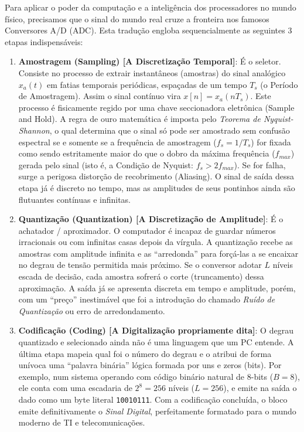 Para aplicar o poder da computação e a inteligência dos processadores no mundo físico, precisamos que o sinal do mundo real cruze a fronteira nos famosos Conversores A/D (ADC). Esta tradução engloba sequencialmente as seguintes 3 etapas indispensáveis:

\begin{enumerate}
\def\labelenumi{\arabic{enumi}.}
\tightlist
\item
  \textbf{Amostragem (Sampling) {[}A Discretização Temporal{]}}: É o seletor. Consiste no processo de extrair instantâneos (amostras) do sinal analógico \(x_a(t)\) em fatias temporais periódicas, espaçadas de um tempo \(T_s\) (o Período de Amostragem). Assim o sinal contínuo vira \(x[n] = x_a(nT_s)\). Este processo é fisicamente regido por uma chave seccionadora eletrônica (Sample and Hold). A regra de ouro matemática é imposta pelo \emph{Teorema de Nyquist-Shannon}, o qual determina que o sinal só pode ser amostrado sem confusão espectral se e somente se a frequência de amostragem (\(f_s = 1/T_s\)) for fixada como sendo estritamente maior do que o dobro da máxima frequência (\(f_{max}\)) gerada pelo sinal (isto é, a Condição de Nyquist: \(f_s > 2f_{max}\)). Se for falha, surge a perigosa distorção de recobrimento (Aliasing). O sinal de saída dessa etapa já é discreto no tempo, mas as amplitudes de seus pontinhos ainda são flutuantes contínuas e infinitas.
\item
  \textbf{Quantização (Quantization) {[}A Discretização de Amplitude{]}}: É o achatador / aproximador. O computador é incapaz de guardar números irracionais ou com infinitas casas depois da vírgula. A quantização recebe as amostras com amplitude infinita e as ``arredonda'' para forçá-las a se encaixar no degrau de tensão permitida mais próximo. Se o conversor adotar \(L\) níveis escada de decisão, cada amostra sofrerá o corte (truncamento) dessa aproximação. A saída já se apresenta discreta em tempo e amplitude, porém, com um ``preço'' inestimável que foi a introdução do chamado \emph{Ruído de Quantização} ou erro de arredondamento.
\item
  \textbf{Codificação (Coding) {[}A Digitalização propriamente dita{]}}: O degrau quantizado e selecionado ainda não é uma linguagem que um PC entende. A última etapa mapeia qual foi o número do degrau e o atribui de forma unívoca uma ``palavra binária'' lógica formada por uns e zeros (bits). Por exemplo, num sistema operando com código binário natural de 8-bits (\(B=8\)), ele conta com uma escadaria de \(2^8 = 256\) níveis (\(L=256\)), e emite na saída o dado como um byte literal \texttt{10010111}. Com a codificação concluída, o bloco emite definitivamente o \emph{Sinal Digital}, perfeitamente formatado para o mundo moderno de TI e telecomunicações.
\end{enumerate}

